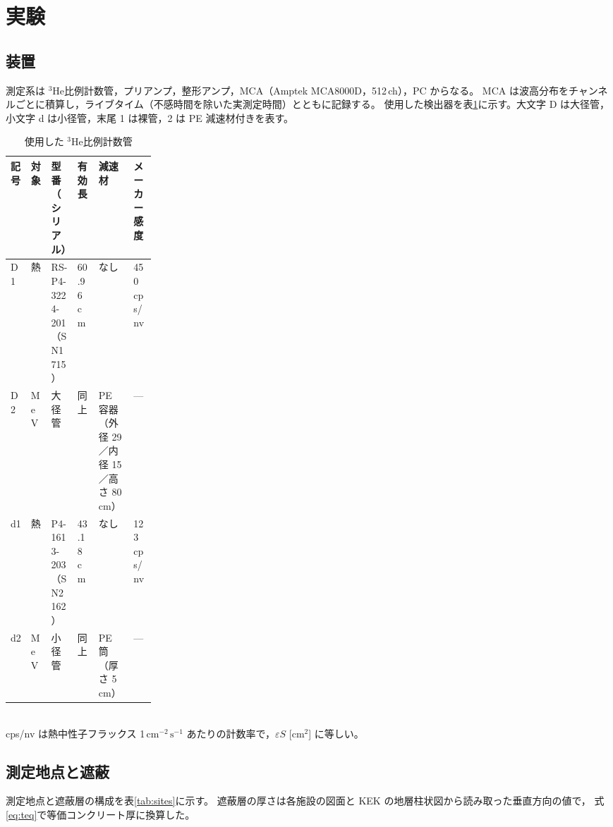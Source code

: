 \documentclass[a4paper,11pt]{ltjsarticle}
\newcommand{\He}{\ensuremath{{}^{3}\mathrm{He}}}
\newcommand{\flux}{\mathrm{cm^{-2}\,s^{-1}}}
\begin{document}
\section{実験}

\subsection{装置}

測定系は \He 比例計数管，プリアンプ，整形アンプ，MCA（Amptek MCA8000D，512\,ch），PC からなる。
MCA は波高分布をチャンネルごとに積算し，ライブタイム（不感時間を除いた実測定時間）とともに記録する。
使用した検出器を表\ref{tab:detectors}に示す。大文字 D は大径管，小文字 d は小径管，末尾 1 は裸管，2 は PE 減速材付きを表す。

\begin{table}[htbp]
  \centering
  \caption{使用した \He 比例計数管}
  \label{tab:detectors}
  \small
  \begin{tabular}{llllp{0.24\linewidth}l}
    \toprule
    記号 & 対象 & 型番（シリアル） & 有効長 & 減速材 & メーカー感度 \\
    \midrule
    D1 & 熱 & RS-P4-3224-201（SN1715） & 60.96\,cm & なし & 450\,cps/nv \\
    D2 & MeV & 大径管 & 同上 & PE 容器（外径 29／内径 15／高さ 80\,cm） & --- \\
    d1 & 熱 & P4-1613-203（SN2162） & 43.18\,cm & なし & 123\,cps/nv \\
    d2 & MeV & 小径管 & 同上 & PE 筒（厚さ 5\,cm） & --- \\
    \bottomrule
  \end{tabular}\\[2pt]
  \footnotesize cps/nv は熱中性子フラックス 1\,$\flux$ あたりの計数率で，$\varepsilon S$ [cm$^2$] に等しい。
\end{table}

\subsection{測定地点と遮蔽}

測定地点と遮蔽層の構成を表\ref{tab:sites}に示す。
遮蔽層の厚さは各施設の図面と KEK の地層柱状図から読み取った垂直方向の値で，
式\eqref{eq:teq}で等価コンクリート厚に換算した。
\end{document}
